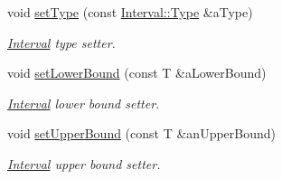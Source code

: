 \begin{DoxyCompactItemize}
void \hyperlink{classostk_1_1math_1_1obj_1_1_interval_a84876dff7017bf9ebb5c7ef71aefffc7}{set\+Type} (const \hyperlink{classostk_1_1math_1_1obj_1_1_interval_base_a0dd9bd29a9bfefa26de9b88ac81de92a}{Interval\+::\+Type} \&a\+Type)
\begin{DoxyCompactList}\small\item\em \hyperlink{classostk_1_1math_1_1obj_1_1_interval}{Interval} type setter. \end{DoxyCompactList}\item 
void \hyperlink{classostk_1_1math_1_1obj_1_1_interval_a958544f14f36300f89e383351279299d}{set\+Lower\+Bound} (const T \&a\+Lower\+Bound)
\begin{DoxyCompactList}\small\item\em \hyperlink{classostk_1_1math_1_1obj_1_1_interval}{Interval} lower bound setter. \end{DoxyCompactList}\item 
void \hyperlink{classostk_1_1math_1_1obj_1_1_interval_a5e53477bc77dea2587283a1fa73b3659}{set\+Upper\+Bound} (const T \&an\+Upper\+Bound)
\begin{DoxyCompactList}\small\item\em \hyperlink{classostk_1_1math_1_1obj_1_1_interval}{Interval} upper bound setter. \end{DoxyCompactList}\end{DoxyCompactItemize}
